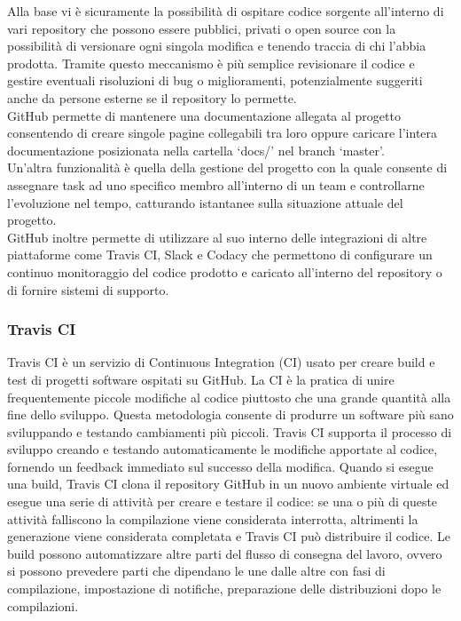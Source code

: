Alla base vi è sicuramente la possibilità di ospitare codice sorgente all'interno di vari repository che possono essere pubblici, privati o open source con la possibilità di versionare ogni singola modifica e tenendo traccia di chi l'abbia prodotta.
Tramite questo meccanismo è più semplice revisionare il codice e gestire eventuali risoluzioni di bug o miglioramenti, potenzialmente suggeriti anche da persone esterne se il repository lo permette.
\\
GitHub permette di mantenere una documentazione allegata al progetto consentendo di creare singole pagine collegabili tra loro oppure caricare l'intera documentazione posizionata nella cartella `docs/' nel branch `master'.
\\
Un'altra funzionalità è quella della gestione del progetto con la quale consente di assegnare task ad uno specifico membro all'interno di un team e controllarne l'evoluzione nel tempo, catturando istantanee sulla situazione attuale del progetto.
\\
GitHub inoltre permette di utilizzare al suo interno delle integrazioni di altre piattaforme come Travis CI,  Slack e Codacy che permettono di configurare un continuo monitoraggio del codice prodotto e caricato all'interno del repository o di fornire sistemi di supporto.

\subsubsection{Travis CI}
Travis CI è un servizio di Continuous Integration (CI) usato per creare build e test di progetti software ospitati su GitHub.
La CI è la pratica di unire frequentemente piccole modifiche al codice piuttosto che una grande quantità alla fine dello sviluppo. Questa metodologia consente di produrre un software più sano sviluppando e testando cambiamenti più piccoli.
Travis CI supporta il processo di sviluppo creando e testando automaticamente le modifiche apportate al codice, fornendo un feedback immediato sul successo della modifica.
Quando si esegue una build, Travis CI clona il repository GitHub in un nuovo ambiente virtuale ed esegue una serie di attività per creare e testare il codice: se una o più di queste attività falliscono la compilazione viene considerata interrotta, altrimenti la generazione viene considerata completata e Travis CI può distribuire il codice.
Le build possono automatizzare altre parti del flusso di consegna del lavoro, ovvero si possono prevedere parti che dipendano le une dalle altre con fasi di compilazione, impostazione di notifiche, preparazione delle distribuzioni dopo le compilazioni.


